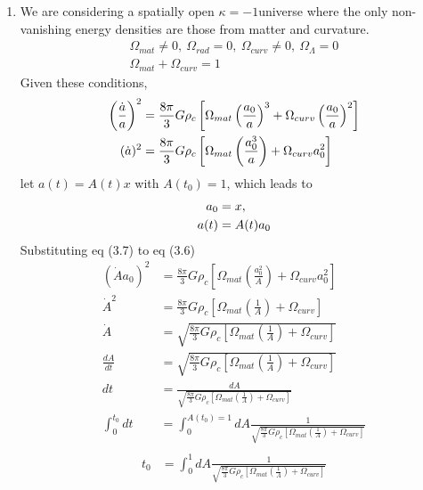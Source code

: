 \begin{enumerate}[label=(\alph*)]
	\item  We are considering a spatially open $\kappa = -1$universe where the only non-vanishing energy densities are those from matter and curvature.
\begin{align}
\Omega_{mat} \ne 0, \> \Omega_{rad} = 0, \> \Omega_{curv} \ne 0, \> \Omega_{\Lambda} = 0 \\
\Omega_{mat} +\Omega_{curv} = 1
\end{align}
Given these conditions, 
\begin{align}
	\left( \frac{\dot{a}}{a}\right)^2 &=\frac{8\pi}{3} G \rho_c \left[ \Omega_{mat} \left( \frac{a_0}{a}\right)^3 + \Omega_{curv}\left( \frac{a_0}{a}\right)^2 \right] \notag \\ 
	(\dot{a})^2 &=\frac{8\pi}{3} G \rho_c \left[ \Omega_{mat} \left( \frac{a_0^3}{a}\right)  + \Omega_{curv} a_0^2 \right] 
\end{align}
let $a(t) = A(t)x$ with $A(t_0)=1$, which leads to  
\begin{align}
a_0 &= x, \notag\\ a(t) &= A(t) a_0
\end{align}
Substituting eq (3.7) to  eq (3.6)
\begin{align*}
	(\dot{A}a_0)^2 &=\frac{8\pi}{3} G \rho_c \left[ \Omega_{mat} \left( \frac{a_0^2}{A}\right)  + \Omega_{curv} a_0^2 \right]  \\
	\dot{A}^2 &=\frac{8\pi}{3} G \rho_c \left[ \Omega_{mat} \left( \frac{1}{A}\right)  + \Omega_{curv}\right]  \\
	\dot{A} &=\sqrt{\frac{8\pi}{3} G \rho_c \left[ \Omega_{mat} \left( \frac{1}{A}\right)  + \Omega_{curv}\right] }\\
	\frac{dA}{dt} &=\sqrt{\frac{8\pi}{3} G \rho_c \left[ \Omega_{mat} \left( \frac{1}{A}\right)  + \Omega_{curv}\right] }\\
	dt &= \frac{dA}{\sqrt{\frac{8\pi}{3} G \rho_c \left[ \Omega_{mat} \left( \frac{1}{A}\right)  + \Omega_{curv}\right] }}  \\
\int_{0}^{t_0}dt  &= \int_0^{A(t_0)=1}dA \frac{1}{\sqrt{\frac{8\pi}{3} G \rho_c \left[ \Omega_{mat} \left( \frac{1}{A}\right)  + \Omega_{curv}\right] }}  \\
\end{align*}
\begin{align*}
	t_0 &= \int_0^{1}dA \frac{1}{\sqrt{\frac{8\pi}{3} G \rho_c \left[ \Omega_{mat} \left( \frac{1}{A}\right)  + \Omega_{curv}\right] }}  \\

\end{align*}
\end{enumerate}
